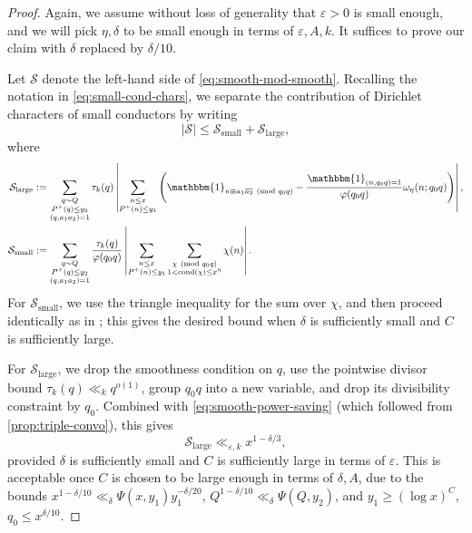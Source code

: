 \documentclass[reqno,11pt]{amsart}
\theoremstyle{remark}
\numberwithin{equation}{section}
\newcommand{\mS}{\mathcal{S}}
\newcommand{\one}{\mathbbm{1}}
\newcommand{\eps}{\varepsilon}
\renewcommand{\bar}{\overline}
\newcommand{\cond}{\textnormal{cond}}
\renewcommand{\pmod}[1]{\ (\textnormal{mod } #1)}
\begin{document}
\begin{proof}
Again, we assume without loss of generality that $\eps > 0$ is small enough, and we will pick $\eta, \delta$ to be small enough in terms of $\eps, A, k$. It suffices to prove our claim with $\delta$ replaced by $\delta/10$.

Let $\mS$ denote the left-hand side of \cref{eq:smooth-mod-smooth}. Recalling the notation in \cref{eq:small-cond-chars}, we separate the contribution of Dirichlet characters of small conductors by writing
\[
    |\mS| \le \mS_{\text{small}} + \mS_{\text{large}},
\]
where
\[
\begin{aligned}
    \mS_{\text{large}} &:= \sum_{\substack{q \sim Q \\ P^+(q) \le y_2 \\ (q, a_1a_2) = 1}}
    \tau_k(q)
    \left\vert 
    \sum_{\substack{n \le x \\ P^+(n) \le y_1}} \left(\one_{n \equiv a_1\bar{a_2} \pmod{q_0q}} - \frac{\one_{(n, q_0q) = 1}}{\varphi(q_0q)} \omega_\eta(n; q_0q) \right)
    \right\vert,
    \\
    \mS_{\text{small}} &:= \sum_{\substack{q \sim Q \\ P^+(q) \le y_2 \\ (q, a_1a_2) = 1}}
    \frac{\tau_k(q)}{\varphi(q_0q)}
    \left\vert 
    \sum_{\substack{n \le x \\ P^+(n) \le y_1}} \sum_{\substack{\chi \pmod{q_0 q} \\ 1 < \cond(\chi) \le x^\eta}} \chi(n)
    \right\vert.
\end{aligned}
\]
For $\mS_{\text{small}}$, we use the triangle inequality for the sum over $\chi$, and then proceed identically as in \cite[after (2.3)]{de2020niveau}; this gives the desired bound when $\delta$ is sufficiently small and $C$ is sufficiently large. 

For $\mS_{\text{large}}$, we drop the smoothness condition on $q$, use the pointwise divisor bound $\tau_k(q) \ll_k q^{o(1)}$, group $q_0q$ into a new variable, and drop its divisibility constraint by $q_0$. Combined with \cref{eq:smooth-power-saving} (which followed from \cref{prop:triple-convo}), this gives
\[
    \mS_{\text{large}} \ll_{\eps,k} x^{1-\delta/3},
\]
provided $\delta$ is sufficiently small and $C$ is sufficiently large in terms of $\eps$. This is acceptable once $C$ is chosen to be large enough in terms of $\delta, A$, due to the bounds $x^{1-\delta/10} \ll_\delta \Psi(x, y_1) y_1^{-\delta/20}$, $Q^{1-\delta/10} \ll_\delta \Psi(Q, y_2)$, and $y_1 \ge (\log x)^C$, $q_0 \le x^{\delta/10}$.
\end{proof}
\end{document}
